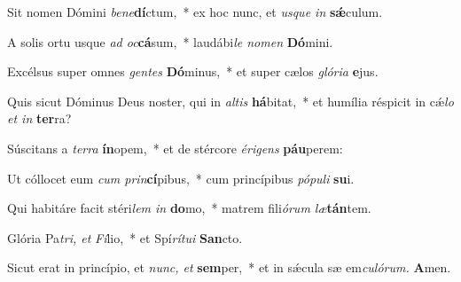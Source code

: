 \item Sit nomen Dómini \textit{bene}\textbf{dí}ctum,~* ex hoc nunc, et \textit{usque in} \textbf{sǽ}culum.
\item A solis ortu usque \textit{ad oc}\textbf{cá}sum,~* laudábi\hspace{0.01em}\textit{le nomen} \textbf{Dó}mini.
\item Excélsus super omnes \textit{gentes} \textbf{Dó}minus,~* et super cælos \textit{glória} \textbf{e}jus.
\item Quis sicut Dóminus Deus noster, qui in \textit{altis} \textbf{há}bitat,~* et humília réspicit in cǽ\textit{lo et in} \textbf{ter}ra?
\item Súscitans a \textit{terra} \textbf{ín}opem,~* et de stércore \textit{érigens} \textbf{páu}perem:
\item Ut cóllocet eum \textit{cum prin}\textbf{cí}pibus,~* cum princípibus \textit{pópuli} \textbf{su}i.
\item Qui habitáre facit stéri\hspace{0.02em}\textit{lem in} \textbf{do}mo,~* matrem fili\textit{órum læ}\textbf{tán}tem.
\item Glória Pa\hspace{0.03em}\textit{tri, et} \textit{Fí}lio,~* et Spí\textit{rítui} \textbf{San}cto.
\item Sicut erat in princípio, et \textit{nunc, et}\textbf{ sem}per,~* et in sǽcula sæ em\textit{culórum.} \textbf{A}men.